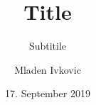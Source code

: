 





 \title[shortform]{Title}
 \subtitle[shortform-subtitle]{Subtitile}
 \author[M. Ivkovic]{Mladen Ivkovic}
 \date[17.09.19]{17. September 2019}









%
%
%
% 
%
% 
% 
% 
%
%
%
%
%
%
%
% 







